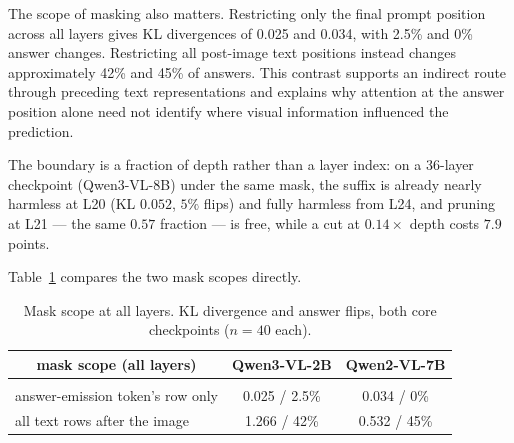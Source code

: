 \documentclass{article} %
\begin{document}
The scope of masking also matters. Restricting only the final prompt
position across all layers gives KL divergences of 0.025 and 0.034,
with 2.5\% and 0\% answer changes. Restricting all post-image text
positions instead changes approximately 42\% and 45\% of answers.
This contrast supports an indirect route through preceding text
representations and explains why attention at the answer position
alone need not identify where visual information influenced the
prediction.

The boundary is a fraction of depth rather than a layer index: on a 36-layer checkpoint (Qwen3-VL-8B) under the same mask, the suffix is already nearly harmless at L20 (KL $0.052$, $5\%$ flips) and fully harmless from L24, and pruning at L21 --- the same $0.57$ fraction --- is free, while a cut at $0.14\times$ depth costs $7.9$ points.

Table~\ref{tab:maskscope} compares the two mask scopes directly.

\begin{table}[t]
\caption{Mask scope at all layers. KL divergence and answer flips, both core checkpoints ($n=40$ each).}
\label{tab:maskscope}
\begin{center}
\small
\begin{tabular}{lcc}
\multicolumn{1}{c}{\bf mask scope (all layers)} &\multicolumn{1}{c}{\bf Qwen3-VL-2B} &\multicolumn{1}{c}{\bf Qwen2-VL-7B}
\\ \hline \\
answer-emission token's row only & 0.025 / 2.5\% & 0.034 / 0\%\\
all text rows after the image & 1.266 / 42\% & 0.532 / 45\%\\
\end{tabular}
\end{center}
\end{table}
\end{document}
